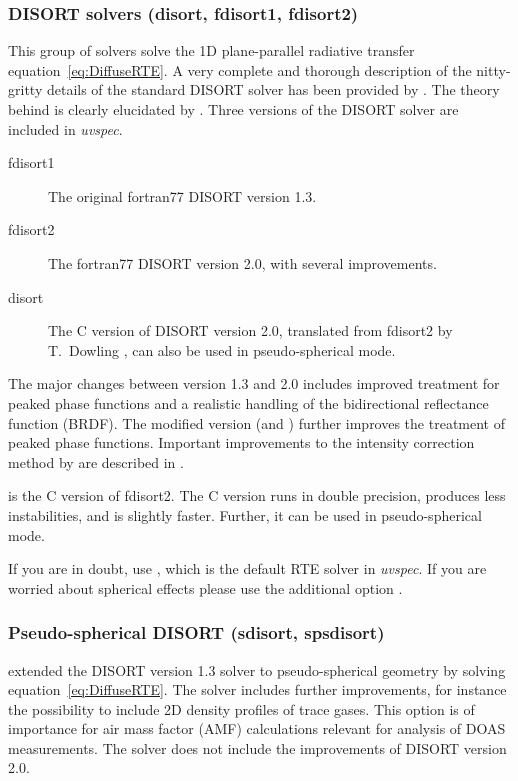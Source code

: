 \subsubsection{DISORT solvers (disort, fdisort1, fdisort2)}
This group of solvers solve the 1D plane-parallel radiative transfer
equation~\ref{eq:DiffuseRTE}.  A very complete and thorough
description of the nitty-gritty details of the standard DISORT solver
has been provided by \citet{stamnes2000}. The theory behind is clearly
elucidated by \citet{Thomas1999}. Three versions of the DISORT solver
are included in {\sl uvspec}.
\begin{description}
\item[fdisort1] The original fortran77 DISORT version 1.3.
\item[fdisort2] The fortran77 DISORT version 2.0, with several improvements.
\item[disort] The C version of DISORT version 2.0, translated from
  fdisort2 by T.~Dowling \citep{buras2011b}, can also be used in
  pseudo-spherical mode.
\end{description}
The major changes between version 1.3 and 2.0 includes improved
treatment for peaked phase functions and a realistic handling of the
bidirectional reflectance function (BRDF). The modified version  (and ) further improves the treatment
of peaked phase functions. Important improvements to the intensity
correction method by \cite{nakajima1988} are described in
\cite{buras2011b}.

 is the C version of fdisort2. The C version runs in
double precision, produces less instabilities, and is slightly
faster. Further, it can be used in pseudo-spherical mode.

If you are in doubt, use , which is the default RTE solver
in {\sl uvspec}. If you are worried about spherical effects please use
the additional option .


\subsubsection{Pseudo-spherical DISORT (sdisort, spsdisort)}
\citet{Dahlback1991} extended the DISORT version 1.3 solver to
pseudo-spherical geometry by solving equation~\ref{eq:DiffuseRTE}. The
 solver includes further 
improvements, for instance the possibility to include 2D density profiles
of trace gases. This option is of importance for air mass factor (AMF)
calculations relevant for analysis of DOAS measurements. The
 solver does not include the improvements of DISORT version
2.0.

